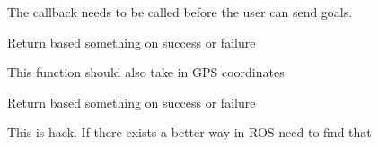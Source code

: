 
\begin{DoxyRefList}
\item[\label{todo__todo000001}%
\hypertarget{todo__todo000001}{}%
\-Member \hyperlink{classspiri__api_1_1get__state_1_1_staterobot_a015efa1f3a59211063e167ec0cb1fc3b}{spiri\-\_\-api.get\-\_\-state.\-Staterobot.\-\_\-\-\_\-init\-\_\-\-\_\-} ]\-The callback needs to be called before the user can send goals. 
\item[\label{todo__todo000002}%
\hypertarget{todo__todo000002}{}%
\-Member \hyperlink{classspiri__api_1_1get__state_1_1_staterobot_af6d1fe436714134bbd2fb78da0b09835}{spiri\-\_\-api.get\-\_\-state.\-Staterobot.send\-\_\-goal} ]\-Return based something on success or failure 

\-This function should also take in \-G\-P\-S coordinates  
\item[\label{todo__todo000003}%
\hypertarget{todo__todo000003}{}%
\-Member \hyperlink{classspiri__api_1_1get__state_1_1_staterobot_abc35e5157bb27bfc35bbfb4aee9df2e5}{spiri\-\_\-api.get\-\_\-state.\-Staterobot.send\-\_\-goal\-\_\-relative\-\_\-threading} ]\-Return based something on success or failure  
\item[\label{todo__todo000004}%
\hypertarget{todo__todo000004}{}%
\-Member \hyperlink{class_staterobot_addfc245d53239eed664812a50a916428}{\-Staterobot\-:\-:send\-\_\-vel} (float x, float y, float z)]\-This is hack. \-If there exists a better way in \-R\-O\-S need to find that 
\end{DoxyRefList}